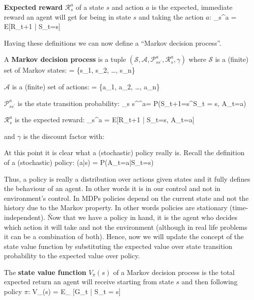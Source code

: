 \textbf{Expected reward} $\mathcal{R}_{s}^{a}$ of a state $s$ and action $a$ is the expected, immediate reward an
agent will get for being in state $s$ and taking the action $a$:
\bse
{}_{s}^{a} = E[R_{t+1} | S_t=s]
\ese
\ed

Having these definitions we can now define a ``Markov decision process''.

A \textbf{Markov decision process} is a tuple $(\mathcal{S}, \mathcal{A}, \mathcal{P}_{s s^\prime}^{a},
\mathcal{R}_{s}^{a}, \gamma)$ where $\mathcal{S}$ is a (finite) set of Markov states:
\bse
{} = \{s_1, s_2, \ldots, s_n\}
\ese

$\mathcal{A}$ is a (finite) set of actions:
\bse
{} = \{a_1, a_2, \ldots, a_n\}
\ese

$\mathcal{P}_{s s^\prime}^{a}$ is the state transition probability:
\bse
{}_{s s^\prime}^{a}= P(S_{t+1}=s^\prime \mid S_{t} = s, A_t=a)
\ese

$\mathcal{R}_{s}^{a} $ is the expected reward:
\bse
{}_{s}^{a} = E[R_{t+1} | S_t=s, A_t=a]
\ese

and $\gamma$ is the discount factor with:
\bse
\gamma \in [0,1]
\ese
\ed

At this point it is clear what a (stochastic) policy really is. Recall the definition of a (stochastic) policy:
\bse
\pi(a|s) = P(A_t=a|S_t=s)
\ese

Thus, a policy is really a distribution over actions given states and it fully defines the behaviour of an agent. In
other words it is in our control and not in environment's control. In MDPs policies depend on the current state and
not the history due to the Markov property. In other words policies are stationary (time-independent). \v

Now that we have a policy in hand, it is the agent who decides which action it will take and not the environment
(although in real life problems it can be a combination of both). Hence, now we will update the concept of the state
value function by substituting the expected value over state transition probability to the expected value over policy.

The \textbf{state value function } $V_{\pi}(s)$ of a Markov decision process is the total expected return an agent
will receive starting from state $s$ and then following policy $\pi$:
\bse
V_{\pi}(s) = E_{\pi} [G_t | S_t = s]
\ese
\ed

